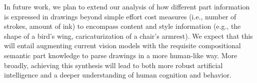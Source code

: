 \documentclass[10pt,letterpaper]{article}
\begin{document}
In future work, we plan to extend our analysis of how different part information is expressed in drawings beyond simple effort cost measures (i.e., number of strokes, amount of ink) to encompass content and style information (e.g., the shape of a bird's wing, caricaturization of a chair's armrest). 
We expect that this will entail augmenting current vision models with the requisite compositional semantic part knowledge to parse drawings in a more human-like way. 
More broadly, achieving this synthesis will lead to both more robust artificial intelligence and a deeper understanding of human cognition and behavior. 






\end{document}
